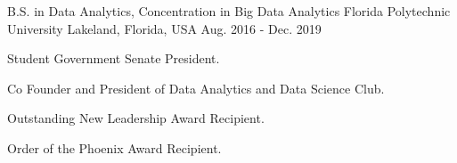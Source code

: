 

\begin{cventries}

  \cventry
    {B.S. in Data Analytics, Concentration in Big Data Analytics} %
    {Florida Polytechnic University} %
    {Lakeland, Florida, USA} %
    {Aug. 2016 - Dec. 2019} %
    {
      \begin{cvitems} %
        \item {Student Government Senate President.}
        \item {Co Founder and President of Data Analytics and Data Science Club.}
        \item {Outstanding New Leadership Award Recipient.}
        \item {Order of the Phoenix Award Recipient.}
      \end{cvitems}
    }

\end{cventries}
